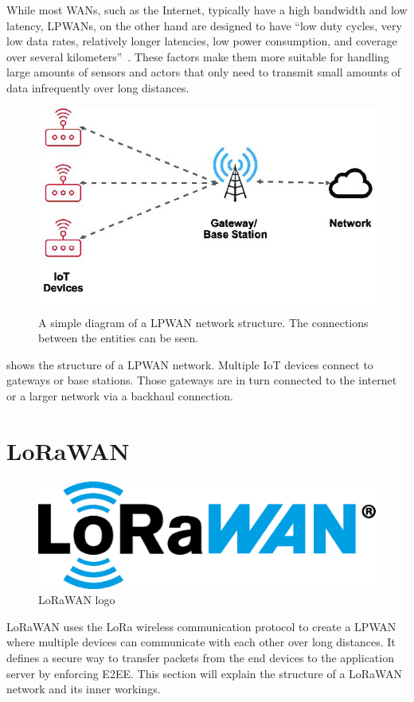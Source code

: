 While most \acp{WAN}, such as the Internet, typically have a high bandwidth and low latency, \acp{LPWAN}, on the other hand are designed to have ``low duty cycles, very low data rates, relatively longer latencies, low power consumption, and coverage over several kilometers''~\cite[p. 289]{kumar_connecting_2023}.
These factors make them more suitable for handling large amounts of sensors and actors that only need to transmit small amounts of data infrequently over long distances.

\begin{figure}[htbp]
    \centering
    \includegraphics[width=.5\textwidth]{pictures/lorawan-structure/lpwan_network_structure.jpg}
    \caption{
        A simple diagram of a \ac{LPWAN} network structure.
        The connections between the entities can be seen.\protect\cite{fernandez_assessing_2020}
    }\label{pic:lpwan-diagram}
\end{figure}

 shows the structure of a \ac{LPWAN} network.
Multiple \ac{IoT} devices connect to gateways or base stations.
Those gateways are in turn connected to the internet or a larger network via a backhaul connection.

\section{\acf{LoRaWAN}}\label{sec:lorawan}

\begin{figure}[htbp]
    \centering
    \includegraphics[width=.3\textwidth]{pictures/logos/LoRaWAN_Logo.eps}
    \caption{
        \ac{LoRaWAN} logo~\protect\cite{lora_alliance_francais_2022}
    }
\end{figure}

\ac{LoRaWAN} uses the \ac{LoRa} wireless communication protocol to create a \ac{LPWAN} where multiple devices can communicate with each other over long distances.
It defines a secure way to transfer packets from the end devices to the application server by enforcing \ac{E2EE}.
This section will explain the structure of a \ac{LoRaWAN} network and its inner workings.


